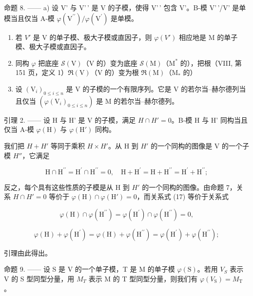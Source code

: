 命题 8. —— a) 设 V' 与 V'\,' 是 V 的子模，使得 V'\,' 包含 V'。B-模 V'\,'/V' 是单模当且仅当 A-模 \(\varphi(\mathrm{V}^{\prime\prime})/\varphi(\mathrm{V}^{\prime})\) 是单模。

\begin{enumerate}
\def\labelenumi{\alph{enumi})}
\setcounter{enumi}{1}
\item
  若 \(V'\) 是 V 的单子模、极大子模或直因子，则 \(\varphi(V')\) 相应地是 M 的单子模、极大子模或直因子。
\item
  同构 \(\varphi\) 把底座 \(\mathcal{S}(\mathrm{V})\)（\(\mathrm{V}\) 的）变为底座 \(\mathcal{S}(\mathrm{M})\)（\(\mathrm{M}^*\) 的），把根（VIII, 第 151 页，定义 1）\(\Re (\mathrm{V})\)（\(\mathrm{V}\) 的）变为根 \(\Re (\mathrm{M})\)（\(\mathrm{M}_{*}\) 的）
\item
  设 \((\mathrm{V}_{i})_{0\leqslant i\leqslant n}\) 是 V 的子模的一个有限序列。它是 V 的若尔当–赫尔德列当且仅当 \((\varphi(\mathrm{V}_{i})_{0\leqslant i\leqslant n})\) 是 M 的若尔当–赫尔德列。
\end{enumerate}

引理 2. —— 设 H 与 H' 是 V 的子模，满足 \(H \cap H' = 0\)。B-模 H 与 H' 同构当且仅当 A-模 \(\varphi(\mathrm{H})\) 与 \(\varphi(\mathrm{H}')\) 同构。

我们把 \(H+H'\) 等同于乘积 \(H \times H'\)。从 H 到 \(H'\) 的一个同构的图像是 V 的一个子模 \(H''\)，它满足

\[
\mathrm{H} \cap \mathrm{H} ^ {\prime \prime} = \mathrm{H} ^ {\prime} \cap \mathrm{H} ^ {\prime \prime} = 0, \quad \mathrm{H} + \mathrm{H} ^ {\prime} = \mathrm{H} + \mathrm{H} ^ {\prime \prime} = \mathrm{H} ^ {\prime} + \mathrm{H} ^ {\prime \prime};\tag{17}
\]

反之，每个具有这些性质的子模是从 H 到 \(H'\) 的一个同构的图像。由命题 7，关系 \(H \cap H' = 0\) 等价于 \(\varphi(\mathrm{H}) \cap \varphi(\mathrm{H}') = 0\)，而关系式 (17) 等价于关系式

\[
\varphi (\mathrm{H}) \cap \varphi (\mathrm{H} ^ {\prime \prime}) = \varphi (\mathrm{H} ^ {\prime}) \cap \varphi (\mathrm{H} ^ {\prime \prime}) = 0,
\]

\[
\varphi (\mathrm{H}) + \varphi (\mathrm{H} ^ {\prime}) = \varphi (\mathrm{H}) + \varphi (\mathrm{H} ^ {\prime \prime}) = \varphi (\mathrm{H} ^ {\prime}) + \varphi (\mathrm{H} ^ {\prime \prime});
\]

引理由此得出。

命题 9. —— 设 S 是 V 的一个单子模，T 是 M 的单子模 \(\varphi(\mathrm{S})\)。若用 \(V_{S}\) 表示 V 的 S 型同型分量，用 \(M_{T}\) 表示 M 的 T 型同型分量，则我们有 \(\varphi(V_{\mathrm{S}})=M_{\mathrm{T}}\)。

